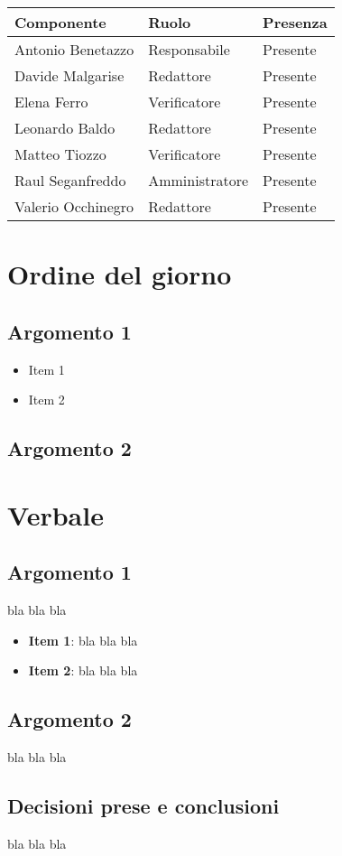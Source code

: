 \documentclass[italian,12pt]{article}
\begin{document}
\begin{flushleft}
	\begin{table}[!h]
	\begin{tabular}{ |l|l|l| } 
		\hline
		\textbf{Componente} & \textbf{Ruolo} & \textbf{Presenza} \\
		\hline 
		Antonio Benetazzo 	& Responsabile   & Presente \\
		Davide Malgarise 	& Redattore      & Presente \\
		Elena Ferro 		& Verificatore   & Presente \\
		Leonardo Baldo 		& Redattore      & Presente \\ 
		Matteo Tiozzo 		& Verificatore   & Presente \\ 
		Raul Seganfreddo 	& Amministratore & Presente \\
		Valerio Occhinegro 	& Redattore      & Presente \\
		\hline
	\end{tabular}
	\end{table}
\end{flushleft}

\section{Ordine del giorno}
\subsection{Argomento 1}
\begin{itemize}
	\item Item 1
	\item Item 2
\end{itemize}
\subsection{Argomento 2}

\newpage

\section{Verbale}

\subsection{Argomento 1}
bla bla bla
\begin{itemize}
	\item \textbf{Item 1}: bla bla bla
	\item \textbf{Item 2}: bla bla bla
\end{itemize}

\subsection{Argomento 2}
bla bla bla

\subsection{Decisioni prese e conclusioni}
bla bla bla
\end{document}
